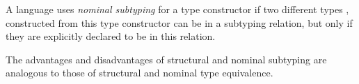 \begin{definition}\label{def:Nominal_Subtyping}
  A language uses \emph{nominal subtyping} for a type constructor if two different types ,  constructed from this type constructor can be in a subtyping relation, but only if they are explicitly declared to be in this relation.
\end{definition}

\begin{remark*}
  The advantages and disadvantages of structural and nominal subtyping are analogous to those of structural and nominal type equivalence.
\end{remark*}



